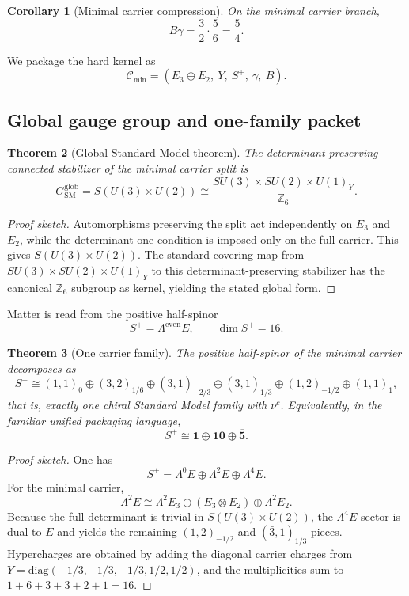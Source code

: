 \documentclass[11pt,a4paper]{article}
\newtheorem{theorem}{Theorem}[section]
\newtheorem{corollary}[theorem]{Corollary}
\theoremstyle{definition}
\theoremstyle{remark}
\newcommand{\SM}{\mathrm{SM}}
\newcommand{\Cmin}{\mathcal C_{\min}}
\begin{document}
\begin{corollary}[Minimal carrier compression]
On the minimal carrier branch,
\[
B\gamma=\frac32\cdot\frac56=\frac54.
\]
\end{corollary}

We package the hard kernel as
\[
\Cmin=(E_3\oplus E_2,\ Y,\ S^+,\ \gamma,\ B).
\]

\subsection{Global gauge group and one-family packet}

\begin{theorem}[Global Standard Model theorem]
The determinant-preserving connected stabilizer of the minimal carrier split is
\[
G_{\SM}^{\mathrm{glob}}
=
S(U(3)\times U(2))
\cong
\frac{SU(3)\times SU(2)\times U(1)_Y}{\mathbb Z_6}.
\]
\end{theorem}

\begin{proof}[Proof sketch]
Automorphisms preserving the split act independently on $E_3$ and $E_2$, while the determinant-one condition is imposed only on the full carrier. This gives $S(U(3)\times U(2))$. The standard covering map from $SU(3)\times SU(2)\times U(1)_Y$ to this determinant-preserving stabilizer has the canonical $\mathbb Z_6$ subgroup as kernel, yielding the stated global form.
\end{proof}

Matter is read from the positive half-spinor
\[
S^+=\Lambda^{\mathrm{even}}E,
\qquad
\dim S^+=16.
\]

\begin{theorem}[One carrier family]
The positive half-spinor of the minimal carrier decomposes as
\[
S^+
\cong
(1,1)_0\oplus(3,2)_{1/6}\oplus(\bar 3,1)_{-2/3}\oplus(\bar 3,1)_{1/3}\oplus(1,2)_{-1/2}\oplus(1,1)_1,
\]
that is, exactly one chiral Standard Model family with $\nu^c$. Equivalently, in the familiar unified packaging language,
\[
S^+\cong \mathbf 1\oplus \mathbf{10}\oplus \overline{\mathbf 5}.
\]
\end{theorem}

\begin{proof}[Proof sketch]
One has
\[
S^+=\Lambda^0E\oplus\Lambda^2E\oplus\Lambda^4E.
\]
For the minimal carrier,
\[
\Lambda^2E
\cong
\Lambda^2E_3\oplus(E_3\otimes E_2)\oplus\Lambda^2E_2.
\]
Because the full determinant is trivial in $S(U(3)\times U(2))$, the $\Lambda^4E$ sector is dual to $E$ and yields the remaining $(1,2)_{-1/2}$ and $(\bar 3,1)_{1/3}$ pieces. Hypercharges are obtained by adding the diagonal carrier charges from $Y=\mathrm{diag}(-1/3,-1/3,-1/3,1/2,1/2)$, and the multiplicities sum to $1+6+3+3+2+1=16$.
\end{proof}
\end{document}
